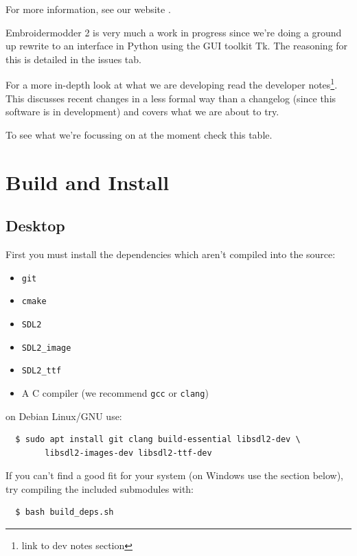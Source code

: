 \documentclass[a4paper, 11pt]{report}
\begin{document}
For more information, see our website \cite{thewebsite}.

Embroidermodder 2 is very much a work in progress since we're doing a ground up rewrite to an interface in Python using the GUI toolkit Tk. The reasoning for this is detailed in the issues tab.

For a more in-depth look at what we are developing read the developer notes\footnote{link to dev notes section}. This discusses recent changes in a less formal way than a changelog (since this software is in development) and covers what we are about to try.

To see what we're focussing on at the moment check this table.



\section{Build and Install}

\subsection{Desktop}

First you must install the dependencies which aren't compiled into the source:

\begin{itemize}
\item \texttt{git}
\item \texttt{cmake}
\item \texttt{SDL2}
\item \texttt{SDL2\_image}
\item \texttt{SDL2\_ttf}
\item A C compiler (we recommend \texttt{gcc} or \texttt{clang})
\end{itemize}

on Debian Linux/GNU use:

\begin{verbatim}
  $ sudo apt install git clang build-essential libsdl2-dev \
        libsdl2-images-dev libsdl2-ttf-dev
\end{verbatim}

If you can't find a good fit for your system (on Windows use the section below),
try compiling the included submodules with:

\begin{verbatim}
  $ bash build_deps.sh
\end{verbatim}
\end{document}
